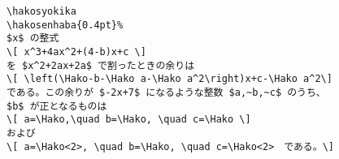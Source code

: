 \begin{verbatim}
\hakosyokika
\hakosenhaba{0.4pt}%
$x$ の整式
\[ x^3+4ax^2+(4-b)x+c \]
を $x^2+2ax+2a$ で割ったときの余りは
\[ \left(\Hako-b-\Hako a-\Hako a^2\right)x+c-\Hako a^2\]
である。この余りが $-2x+7$ になるような整数 $a,~b,~c$ のうち、
$b$ が正となるものは
\[ a=\Hako,\quad b=\Hako, \quad c=\Hako \]
および
\[ a=\Hako<2>, \quad b=\Hako, \quad c=\Hako<2>　である。\]
\end{verbatim}
